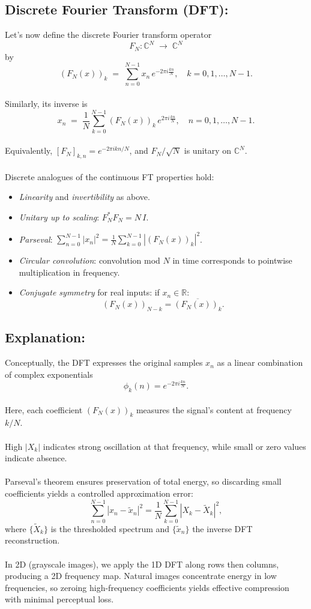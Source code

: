 \documentclass[12pt]{article}
\begin{document}
\subsection{Discrete Fourier Transform (DFT):}
Let's now define the discrete Fourier transform operator
\[
F_N\colon \mathbb{C}^N \;\longrightarrow\; \mathbb{C}^N
\]
\noindent by
\[
(F_N(x))_k
\;=\;
\sum_{n=0}^{N-1} x_n\,e^{-2\pi i \frac{k n}{N}},
\quad k=0,1,\dots,N-1.
\]
\\
\noindent Similarly, its inverse is
\[
x_n
\;=\;
\frac{1}{N}
\sum_{k=0}^{N-1}(F_N(x))_k\,e^{2\pi i \frac{k n}{N}},
\quad n=0,1,\dots,N-1.
\]
\\
\noindent Equivalently, $[F_N]_{k,n}=e^{-2\pi i kn/N}$, and $F_N/\sqrt{N}$ is unitary on $\mathbb{C}^N$.
\\
\\
Discrete analogues of the continuous FT properties hold:
\begin{itemize}
  \item \emph{Linearity} and \emph{invertibility} as above.
  \item \emph{Unitary up to scaling}: $F_N^* F_N = N\,I$.
  \item \emph{Parseval}: $\sum_{n=0}^{N-1}|x_n|^2 = \frac{1}{N}\sum_{k=0}^{N-1}|(F_N(x))_k|^2$.
  \item \emph{Circular convolution}: convolution mod $N$ in time corresponds to pointwise multiplication in frequency.
  \item \emph{Conjugate symmetry} for real inputs: if $x_n\in\mathbb{R}$:
\[
(F_N(x))_{N-k} =\overline{(F_N(x))_k}.
\]
\end{itemize}
\subsection{Explanation:}
Conceptually, the DFT expresses the original samples $x_n$ as a linear combination of complex exponentials
\[
\phi_k(n)=e^{-2\pi i \frac{k n}{N}}.
\]
\\
\noindent Here, each coefficient $(F_N(x))_k$ measures the signal's content at frequency $k/N$.  
\\
\\
High $|X_k|$ indicates strong oscillation at that frequency, while small or zero values indicate absence.
\\
\\
Parseval’s theorem ensures preservation of total energy, so discarding small coefficients yields a controlled approximation error:
\[
\sum_{n=0}^{N-1}|x_n-\tilde x_n|^2
=
\frac{1}{N}\sum_{k=0}^{N-1}|X_k-\tilde X_k|^2,
\]
\noindent where $\{\tilde X_k\}$ is the thresholded spectrum and $\{\tilde x_n\}$ the inverse DFT reconstruction.
\\
\\
In 2D (grayscale images), we apply the 1D DFT along rows then columns, producing a 2D frequency map.  Natural images concentrate energy in low frequencies, so zeroing high-frequency coefficients yields effective compression with minimal perceptual loss.
\end{document}
